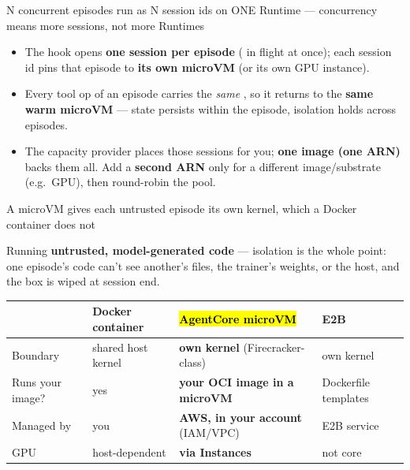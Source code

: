 \begin{frame}{N concurrent episodes run as N session ids on ONE Runtime --- concurrency means more sessions, not more Runtimes}
\vspace{2mm}
\begin{itemize}\small\setlength{\itemsep}{2.5mm}
\item The  hook opens \textbf{one session per episode} ( in flight at once); each session id pins that episode to \textbf{its own microVM} (or its own GPU instance).
\item Every tool op of an episode carries the \emph{same} , so it returns to the \textbf{same warm microVM} --- state persists within the episode, isolation holds across episodes.
\item The capacity provider places those  sessions for you; \textbf{one image (one ARN)} backs them all. Add a \textbf{second ARN} only for a different image/substrate (e.g.\ GPU), then round-robin the pool.
\end{itemize}
\vspace{4mm}
\end{frame}

\begin{frame}{A microVM gives each untrusted episode its own kernel, which a Docker container does not}
{\footnotesize Running \textbf{untrusted, model-generated code} --- isolation is the whole point: one episode's code can't see another's files, the trainer's weights, or the host, and the box is wiped at session end.\par}
\vspace{3mm}
\footnotesize
\begin{tabularx}{\textwidth}{@{}l Y Y Y@{}}
\toprule
 & \textbf{Docker container} & \hl{AgentCore microVM} & \textbf{E2B}\\
\midrule
Boundary & shared host kernel & \textbf{own kernel} (Firecracker-class) & own kernel\\
Runs your image? & yes & \textbf{your OCI image in a microVM} & Dockerfile templates\\
Managed by & you & \textbf{AWS, in your account} (IAM/VPC) & E2B service\\
GPU & host-dependent & \textbf{via Instances} & not core\\
\bottomrule
\end{tabularx}
\end{frame}

